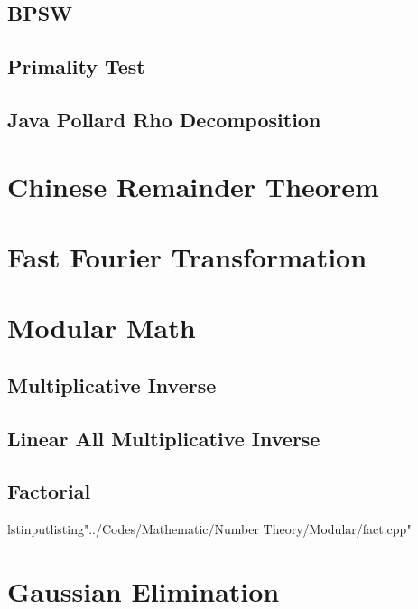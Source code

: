 \documentclass[10pt,a4paper]{report}
\begin{document}
		\subsection{BPSW}
			
		\newpage
		\subsection{Primality Test}
			
		\newpage
		\subsection{Java Pollard Rho Decomposition}
			
		
	\section{Chinese Remainder Theorem}
	
	\newpage
	\section{Fast Fourier Transformation}
		
	
	\newpage
	\section{Modular Math}
		\subsection{Multiplicative Inverse}
			
		\subsection{Linear All Multiplicative Inverse}
			
		\newpage
		\subsection{Factorial}
			lstinputlisting{"../Codes/Mathematic/Number Theory/Modular/fact.cpp"}
	\newpage
	\section{Gaussian Elimination}
		
\end{document}
